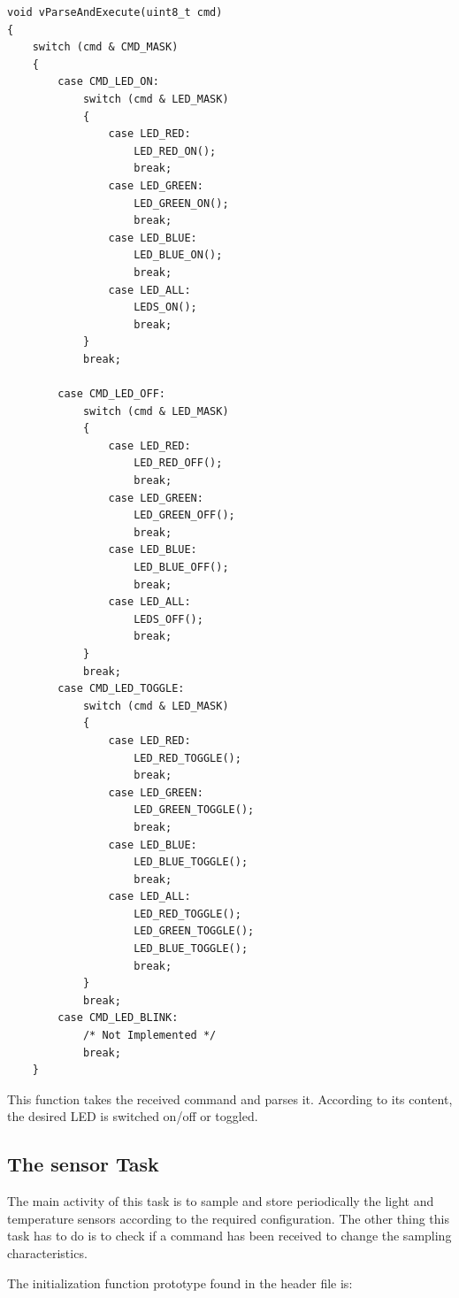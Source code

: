 \documentclass[11pt]{report}
\begin{document}
\begin{verbatim}
void vParseAndExecute(uint8_t cmd)
{
    switch (cmd & CMD_MASK)
    {
        case CMD_LED_ON:
            switch (cmd & LED_MASK)
            {
                case LED_RED:
                    LED_RED_ON();
                    break;
                case LED_GREEN:
                    LED_GREEN_ON();
                    break;
                case LED_BLUE:
                    LED_BLUE_ON();
                    break;
                case LED_ALL:
                    LEDS_ON();
                    break;
            }
            break;

        case CMD_LED_OFF:
            switch (cmd & LED_MASK)
            {
                case LED_RED:
                    LED_RED_OFF();
                    break;
                case LED_GREEN:
                    LED_GREEN_OFF();
                    break;
                case LED_BLUE:
                    LED_BLUE_OFF();
                    break;
                case LED_ALL:
                    LEDS_OFF();
                    break;
            }
            break;
        case CMD_LED_TOGGLE:
            switch (cmd & LED_MASK)
            {
                case LED_RED:
                    LED_RED_TOGGLE();
                    break;
                case LED_GREEN:
                    LED_GREEN_TOGGLE();
                    break;
                case LED_BLUE:
                    LED_BLUE_TOGGLE();
                    break;
                case LED_ALL:
                    LED_RED_TOGGLE();
                    LED_GREEN_TOGGLE();
                    LED_BLUE_TOGGLE();
                    break;
            }
            break;
        case CMD_LED_BLINK:
            /* Not Implemented */
            break;
    }
\end{verbatim}
This function takes the received command and parses it. According to its content, the desired LED is switched on/off or toggled.

\subsection{The sensor Task}
The main activity of this task is to sample and store periodically the light and temperature sensors according to the required configuration. The other thing this task has to do is to check if a command has been received to change the sampling characteristics.

The initialization function prototype found in the header file is:
\end{document}
